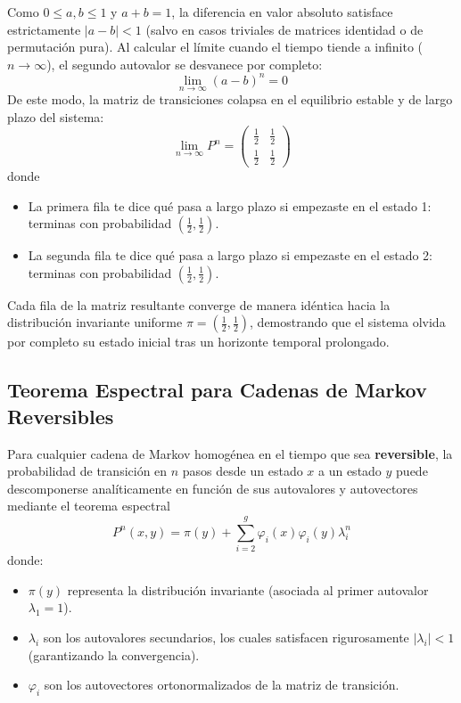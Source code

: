 \begin{ejemplo}
    \noindent
    Como $0 \le a, b \le 1$ y $a+b=1$, la diferencia en valor absoluto satisface estrictamente $|a-b| < 1$ (salvo en casos triviales de matrices identidad o de permutación pura). Al calcular el límite cuando el tiempo tiende a infinito ($n \to \infty$), el segundo autovalor se desvanece por completo:
    \[ 
    \lim_{n \to \infty} (a-b)^n = 0 
    \]
    De este modo, la matriz de transiciones colapsa en el equilibrio estable y de largo plazo del sistema:
    \[ 
    \lim_{n \to \infty} P^n = \begin{pmatrix} \frac{1}{2} & \frac{1}{2} \\[0.15cm] \frac{1}{2} & \frac{1}{2} \end{pmatrix}
    \]
    donde 
    \begin{itemize}
        \item  La primera fila te dice qué pasa a largo plazo si empezaste en el estado 1: terminas con probabilidad $\left(\frac{1}{2}, \frac{1}{2}\right)$.  
        \item La segunda fila te dice qué pasa a largo plazo si empezaste en el estado 2: terminas con probabilidad $\left(\frac{1}{2}, \frac{1}{2}\right)$.  
    \end{itemize}
    Cada fila de la matriz resultante converge de manera idéntica hacia la distribución invariante uniforme $\pi = \left(\frac{1}{2}, \frac{1}{2}\right)$, demostrando que el sistema olvida por completo su estado inicial tras un horizonte temporal prolongado.    
\end{ejemplo}


\subsection{Teorema Espectral para Cadenas de Markov Reversibles}

\begin{teo}
    Para cualquier cadena de Markov homogénea en el tiempo que sea \textbf{reversible}, la probabilidad de transición en $n$ pasos desde un estado $x$ a un estado $y$ puede descomponerse analíticamente en función de sus autovalores y autovectores mediante el teorema espectral
    \begin{equation}
        P^n(x,y) = \pi(y) + \sum_{i=2}^{g} \varphi_i(x)\varphi_i(y)\lambda_i^n
    \end{equation}
    donde:
    \begin{itemize}
        \item $\pi(y)$ representa la distribución invariante (asociada al primer autovalor $\lambda_1 = 1$).
        \item $\lambda_i$ son los autovalores secundarios, los cuales satisfacen rigurosamente $|\lambda_i| < 1$ (garantizando la convergencia).
        \item $\varphi_i$ son los autovectores ortonormalizados de la matriz de transición.
    \end{itemize}
\end{teo}

